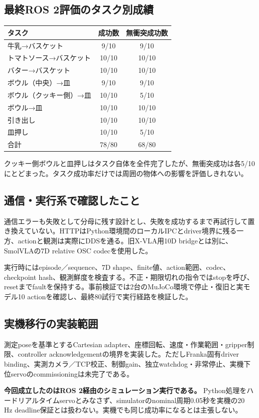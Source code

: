 \documentclass[paper=a4,fontsize=10pt,baselineskip=15pt]{jlreq}
\begin{document}
\subsection{最終ROS 2評価のタスク別成績}
\begin{center}
\begin{tabular}{@{}lcc@{}}\toprule
タスク & 成功数 & 無衝突成功数\\\midrule
牛乳→バスケット & 9/10 & 9/10\\
トマトソース→バスケット & 10/10 & 10/10\\
バター→バスケット & 10/10 & 10/10\\
ボウル（中央）→皿 & 9/10 & 9/10\\
ボウル（クッキー側）→皿 & 10/10 & 5/10\\
ボウル→皿 & 10/10 & 10/10\\
引き出し & 10/10 & 10/10\\
皿押し & 10/10 & 5/10\\\midrule
合計 & 78/80 & 68/80\\\bottomrule
\end{tabular}
\end{center}
クッキー側ボウルと皿押しはタスク自体を全件完了したが、無衝突成功は各5/10にとどまった。タスク成功率だけでは周囲の物体への影響を評価しきれない。
\subsection{通信・実行系で確認したこと}
通信エラーも失敗として分母に残す設計とし、失敗を成功するまで再試行して置き換えていない。HTTPはPython環境間のローカルIPCとdriver境界に残る一方、actionと観測は実際にDDSを通る。旧X-VLA用10D bridgeとは別に、SmolVLAの7D relative OSC codecを使用した。

実行時にはepisode／sequence、7D shape、finite値、action範囲、codec、checkpoint hash、観測鮮度を検査する。不正・期限切れの指令ではstopを呼び、resetまでfaultを保持する。事前検証では2台のMuJoCo環境で停止・復旧と実モデル10 actionを確認し、最終80試行で実行経路を検証した。
\subsection{実機移行の実装範囲}
測定poseを基準とするCartesian adapter、座標回転、速度・作業範囲・gripper制限、controller acknowledgementの境界を実装した。ただしFranka固有driver binding、実測カメラ／TCP校正、制御gain、独立watchdog・非常停止、実機下位servoのcommissioningは未完了である。

\textbf{今回成立したのはROS 2経由のシミュレーション実行である。} Python処理をハードリアルタイムservoとみなさず、simulatorのnominal周期0.05秒を実機の20 Hz deadline保証とは扱わない。実機でも同じ成功率になるとは主張しない。
\newpage
\end{document}
